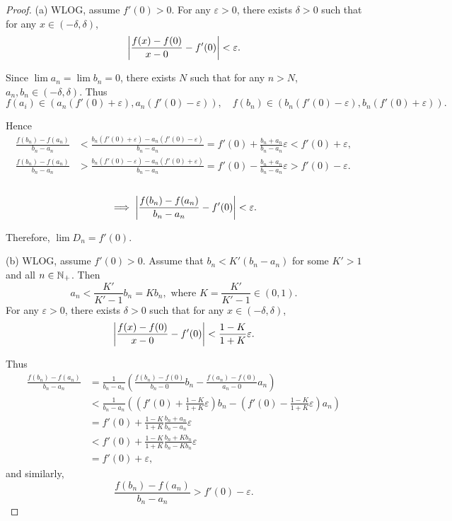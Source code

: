 \documentclass{article}
\begin{document}
\begin{proof}
  (a) WLOG, assume \( f'(0)>0 \). For any \( \varepsilon>0 \), there exists \( \delta>0 \) such that for any \( x\in(-\delta,\delta) \), 
  \[ \left|\frac{f(x)-f(0)}{x-0}-f'(0)\right|<\varepsilon. \] \par
  Since \( \lim a_n=\lim b_n=0 \), there exists \( N \) such that for any \( n>N \), \( a_n,b_n\in(-\delta,\delta) \). Thus
  \[ f(a_i)\in\left( a_n\left( f'(0)+\varepsilon \right), a_n\left( f'(0)-\varepsilon \right) \right),\quad
    f(b_n)\in\left( b_n\left( f'(0)-\varepsilon \right),b_n\left( f'(0)+\varepsilon \right) \right). \]\par
    Hence
    \begin{align*}
      \frac{f(b_n)-f(a_n)}{b_n-a_n}
      &<\frac{b_n(f'(0)+\varepsilon)-a_n(f'(0)-\varepsilon)}{b_n-a_n}
      =f'(0)+\frac{b_n+a_n}{b_n-a_n}\varepsilon<f'(0)+\varepsilon,\\
      \frac{f(b_n)-f(a_n)}{b_n-a_n}
      &>\frac{b_n(f'(0)-\varepsilon)-a_n(f'(0)+\varepsilon)}{b_n-a_n}
      =f'(0)-\frac{b_n+a_n}{b_n-a_n}\varepsilon>f'(0)-\varepsilon.
    \end{align*}\\[-12pt]
    \[ \implies \left|\frac{f(b_n)-f(a_n)}{b_n-a_n}-f'(0)\right|<\varepsilon. \]\par
    Therefore, \( \lim D_n=f'(0) \).\par
  (b) WLOG, assume \( f'(0)>0 \). Assume that \( b_n<K'(b_n-a_n) \) for some \( K'>1 \) and all \( n\in\mathbb{N}_+ \). Then
  \[ a_n<\frac{K'}{K'-1}b_n=Kb_n,\text{ where } K=\frac{K'}{K'-1}\in(0,1). \]
  For any \( \varepsilon>0 \), there exists \( \delta>0 \) such that for any \( x\in(-\delta,\delta) \), 
  \[ \left|\frac{f(x)-f(0)}{x-0}-f'(0)\right|<\frac{1-K}{1+K}\varepsilon. \]\par
  Thus
  \begin{align*}
    \frac{f(b_n)-f(a_n)}{b_n-a_n}
    &=\frac{1}{b_n-a_n}\left( \frac{f(b_n)-f(0)}{b_n-0}b_n-\frac{f(a_n)-f(0)}{a_n-0}a_n \right)\\
    &<\frac{1}{b_n-a_n}\left( \left( f'(0)+\frac{1-K}{1+K}\varepsilon \right)b_n-\left( f'(0)-\frac{1-K}{1+K}\varepsilon \right)a_n \right)\\
    &=f'(0)+\frac{1-K}{1+K}\frac{b_n+a_n}{b_n-a_n}\varepsilon\\
    &<f'(0)+\frac{1-K}{1+K}\frac{b_n+Kb_n}{b_n-Kb_n}\varepsilon\\
    &=f'(0)+\varepsilon,
  \end{align*}
  and similarly,
  \[ \frac{f(b_n)-f(a_n)}{b_n-a_n}>f'(0)-\varepsilon. \]\par

\end{proof}
\end{document}
